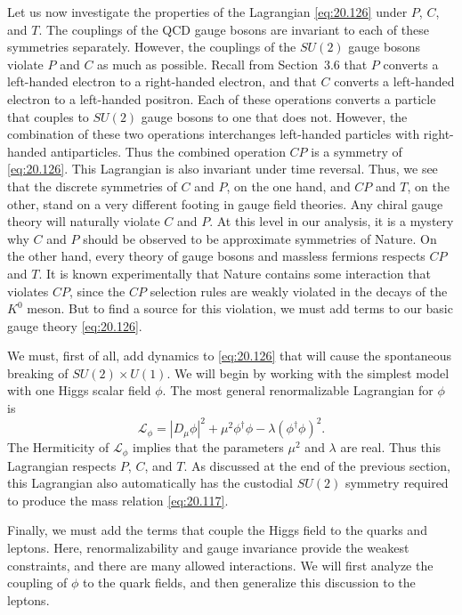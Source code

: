 Let us now investigate the properties of the Lagrangian \eqref{eq:20.126}
under $P$, $C$, and $T$.  The couplings of the QCD gauge bosons are invariant
to each of these symmetries separately.  However, the couplings of the $SU(2)$
gauge bosons violate $P$ and $C$ as much as possible.  Recall from
Section~3.6 that $P$ converts a left-handed electron to a right-handed
electron, and that $C$ converts a left-handed electron to a left-handed
positron.  Each of these operations converts a particle that couples to
$SU(2)$ gauge bosons to one that does not.  However, the combination of these
two operations interchanges left-handed particles with right-handed
antiparticles.  Thus the combined operation $CP$ is a symmetry of
\eqref{eq:20.126}.  This Lagrangian is also invariant under time reversal.
Thus, we see that the discrete symmetries of $C$ and $P$, on the one hand, and
$CP$ and $T$, on the other, stand on a very different footing in gauge field
theories.  Any chiral gauge theory will naturally violate $C$ and $P$.  At
this level in our analysis, it is a mystery why $C$ and $P$ should be observed
to be approximate symmetries of Nature.  On the other hand, every theory of
gauge bosons and massless fermions respects $CP$ and $T$.  It is known
experimentally that Nature contains some interaction that violates $CP$, since
the $CP$ selection rules are weakly violated in the decays of the $K^0$ meson.
But to find a source for this violation, we must add terms to our basic gauge
theory \eqref{eq:20.126}.

We must, first of all, add dynamics to \eqref{eq:20.126} that will cause the
spontaneous breaking of $SU(2)\times U(1)$.  We will begin by working with the
simplest model with one Higgs scalar field $\phi$.  The most general
renormalizable Lagrangian for $\phi$ is
\begin{equation}
  \mathcal{L}_{\phi} = |D_\mu\phi|^2 + \mu^2\phi^{\dagger}\phi
    - \lambda(\phi^{\dagger}\phi)^2 .
  \label{eq:20.130}
\end{equation}
The Hermiticity of $\mathcal{L}_{\phi}$ implies that the parameters $\mu^2$
and $\lambda$ are real.  Thus this Lagrangian respects $P$, $C$, and $T$.  As
discussed at the end of the previous section, this Lagrangian also
automatically has the custodial $SU(2)$ symmetry required to produce the mass
relation \eqref{eq:20.117}.

Finally, we must add the terms that couple the Higgs field to the quarks and
leptons.  Here, renormalizability and gauge invariance provide the weakest
constraints, and there are many allowed interactions.  We will first analyze
the coupling of $\phi$ to the quark fields, and then generalize this
discussion to the leptons.

